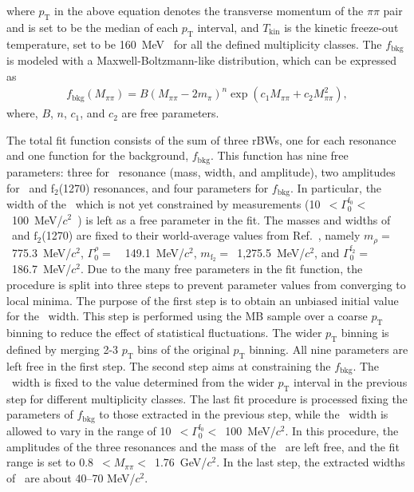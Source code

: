 where $p_{\mathrm{T}}$ in the above equation denotes the transverse momentum of the $\pi\pi$ pair and is set to be the median of each $p_{\mathrm{T}}$ interval, and $T_{\mathrm{kin}}$ is the kinetic freeze-out temperature, set to be 160~MeV~\cite{ALICE:2018qdv} for all the defined multiplicity classes. The $f_{\mathrm{bkg}}$ is modeled with a Maxwell-Boltzmann-like distribution, which can be expressed as~\cite{OPAL:1998enc}
\begin{eqnarray}
f_{\mathrm{bkg}}(M_{\pi\pi}) = B(M_{\pi\pi}-2m_{\pi})^{n}\exp{(c_{1}M_{\pi\pi} + c_{2}M_{\pi\pi}^{2})},
\label{eq:bkg}
\end{eqnarray} 
where, $B$, $n$, $c_{1}$, and $c_{2}$ are free parameters. 

The total fit function consists of the sum of three rBWs, one for each resonance and one function for the background, $f_{\mathrm{bkg}}$. This function has nine free parameters: three for \fzero~resonance (mass, width, and amplitude), two amplitudes for \rhoz~and f$_{2}$(1270) resonances, and four parameters for $f_{\mathrm{bkg}}$. In particular, the width of the \fzero~which is not yet constrained by measurements (10~$<\Gamma_{0}^{\mathrm{f}_{0}}<$~100~MeV/$c^{2}$~\cite{ParticleDataGroup:2022pth}) is left as a free parameter in the fit. The masses and widths of \rhoz~and $\mathrm{f}_{2}$(1270) are fixed to their world-average values from Ref.~\cite{ParticleDataGroup:2022pth}, namely $m_{\rho}=$~775.3~MeV/$c^{2}$, $\Gamma^{\rho}_{0}=$~~149.1~MeV/$c^{2}$, $m_{\mathrm{f}_{2}}=$~1,275.5~MeV/$c^{2}$, and $\Gamma^{\mathrm{f}_{2}}_{0}=$~186.7~MeV/$c^{2}$. Due to the many free parameters in the fit function, the procedure is split into three steps to prevent parameter values from converging to local minima. The purpose of the first step is to obtain an unbiased initial value for the \fzero~width. This step is performed using the MB sample over a coarse $p_{\mathrm{T}}$ binning to reduce the effect of statistical fluctuations. The wider $p_{\mathrm{T}}$ binning is defined by merging 2-3 $p_{\mathrm{T}}$ bins of the original $p_{\mathrm{T}}$ binning. All nine parameters are left free in the first step. The second step aims at constraining the $f_{\mathrm{bkg}}$. The \fzero~width is fixed to the value determined from the wider $p_{\mathrm{T}}$ interval in the previous step for different multiplicity classes. The last fit procedure is processed fixing the parameters of $f_{\mathrm{bkg}}$ to those extracted in the previous step, while the \fzero~width is allowed to vary in the range of 10~$<\Gamma_{0}^{\mathrm{f}_{0}}<$~100~MeV/$c^{2}$. In this procedure, the amplitudes of the three resonances and the mass of the \fzero~are left free, and the fit range is set to 0.8~$<M_{\pi\pi}<$~1.76~GeV/$c^{2}$. In the last step, the extracted widths of \fzero~are about 40--70 MeV/$c^{2}$.

